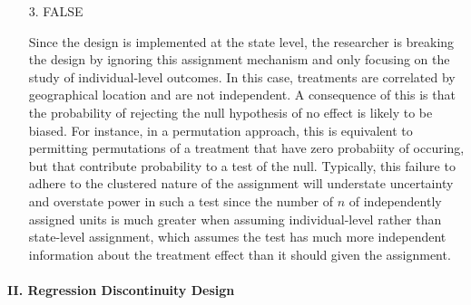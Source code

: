 \documentclass{article}
\begin{document}
\begin{itemize}
\item[3.] FALSE

  Since the design is implemented at the state level, the researcher
  is breaking the design by ignoring this assignment mechanism and
  only focusing on the study of individual-level outcomes. In this
  case, treatments are correlated by geographical location and are not
  independent.  A consequence of this is that the probability of
  rejecting the null hypothesis of no effect is likely to be
  biased. For instance, in a permutation approach, this is equivalent
  to permitting permutations of a treatment that have zero probabiity
  of occuring, but that contribute probability to a test of the null.
  Typically, this failure to adhere to the clustered nature of the
  assignment will understate uncertainty and overstate power in such a
  test since the number of $n$ of independently assigned units is much
  greater when assuming individual-level rather than state-level
  assignment, which assumes the test has much more independent
  information about the treatment effect than it should given the
  assignment.  

\end{itemize}


\paragraph{\Large II. Regression Discontinuity Design \\ \\}
\vspace{1em} 
\end{document}
